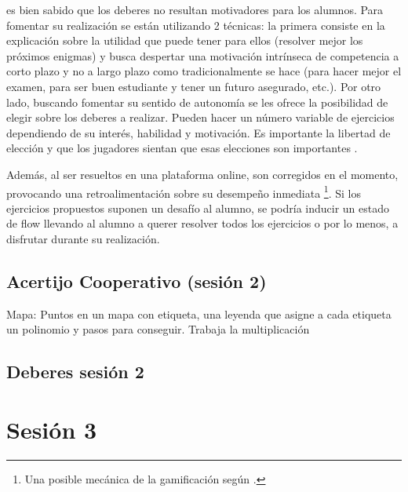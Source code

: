 	es bien sabido que los deberes no resultan motivadores para los alumnos. 
	Para fomentar su realización se están utilizando 2 técnicas: 
	la primera consiste en la explicación sobre la utilidad que puede tener para ellos (resolver mejor los próximos enigmas) y busca despertar una motivación intrínseca de competencia a corto plazo y no a largo plazo como tradicionalmente se hace (para hacer mejor el examen, para ser buen estudiante y tener un futuro asegurado, etc.).
	Por otro lado, buscando fomentar su sentido de autonomía se les ofrece la posibilidad de elegir sobre los deberes a realizar. 
	Pueden hacer un número variable de ejercicios dependiendo de su interés, habilidad y motivación.
	Es importante la libertad de elección y que los jugadores sientan que esas elecciones son importantes \citep{werbach2012win}.

	Además, al ser resueltos en una plataforma online, son corregidos en el momento, provocando una retroalimentación sobre su desempeño inmediata
	\footnote{Una posible mecánica de la gamificación según \citeauthor{werbach2012win}.}.
	Si los ejercicios propuestos suponen un desafío al alumno, se podría inducir un estado de flow llevando al alumno a querer resolver todos los ejercicios o por lo menos, a disfrutar durante su realización.


\subsection{Acertijo Cooperativo (sesión 2)}
\label{app:ses2:coop}


Mapa: Puntos en un mapa con etiqueta, una leyenda que asigne a cada etiqueta un polinomio y pasos para conseguir.
%
Trabaja la multiplicación


\subsection{Deberes sesión 2}
\label{app:ses2:deberes}





\section{Sesión 3}

